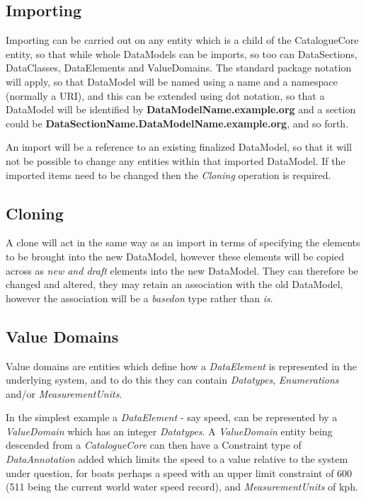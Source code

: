 \documentclass{article}
\begin{document}
\subsection{Importing}

Importing can be carried out on any entity which is a child of the CatalogueCore entity, so that while whole DataModels can be imports, so too can DataSections, DataClasses, DataElements and ValueDomains. The standard package notation will apply, so that DataModel will be named using a name and a namespace (normally a URI), and this can be extended using dot notation, so that a DataModel will be identified by \textbf{DataModelName.example.org} and a section could be \textbf{DataSectionName.DataModelName.example.org}, and so forth.

An import will be a reference to an existing finalized DataModel, so that it will not be possible to change any entities within that imported DataModel. If the imported items need to be changed then the \emph{Cloning} operation is required.

\subsection{Cloning}

A clone will act in the same way as an import in terms of specifying the elements to be brought into the new DataModel, however these elements will be copied across as \emph{new and draft} elements into the new DataModel. They can therefore be changed and altered, they may retain an association with the old DataModel, however the association will be a \emph{basedon} type rather than \emph{is}. 



\subsection{Value Domains}

Value domains are entities which define how a \emph{DataElement} is represented in the underlying system, and to do this they can contain \emph{Datatypes}, \emph{Enumerations} and/or \emph{MeasurementUnits}. 

In the simplest example a \emph{DataElement} - say speed, can be represented by a \emph{ValueDomain} which has an integer \emph{Datatypes}. A  \emph{ValueDomain} entity being descended from a \emph{CatalogueCore} can then have a Constraint type of \emph{DataAnnotation} added which limits the speed to a value relative to the system under question, for boats perhaps a speed with an upper limit constraint of 600 (511 being the current world water speed record), and \emph{MeasurementUnits} of kph. 
\end{document}
